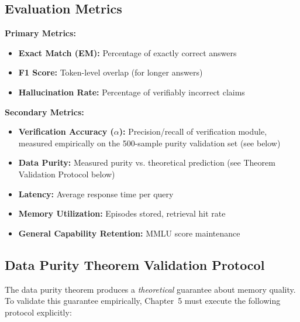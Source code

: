 \documentclass[12pt,a4paper]{article}
\theoremstyle{definition}
\begin{document}
\subsection{Evaluation Metrics}

\textbf{Primary Metrics:}
\begin{itemize}
    \item \textbf{Exact Match (EM):} Percentage of exactly correct answers
    \item \textbf{F1 Score:} Token-level overlap (for longer answers)
    \item \textbf{Hallucination Rate:} Percentage of verifiably incorrect claims
\end{itemize}

\textbf{Secondary Metrics:}
\begin{itemize}
    \item \textbf{Verification Accuracy ($\alpha$):} Precision/recall of verification module, measured empirically on the 500-sample purity validation set (see below)
    \item \textbf{Data Purity:} Measured purity vs. theoretical prediction (see Theorem Validation Protocol below)
    \item \textbf{Latency:} Average response time per query
    \item \textbf{Memory Utilization:} Episodes stored, retrieval hit rate
    \item \textbf{General Capability Retention:} MMLU score maintenance
\end{itemize}

\subsection{Data Purity Theorem Validation Protocol}
\label{sec:purity-validation-protocol}

The data purity theorem produces a \textit{theoretical} guarantee about memory quality. To validate this guarantee empirically, Chapter~5 must execute the following protocol explicitly:
\end{document}
